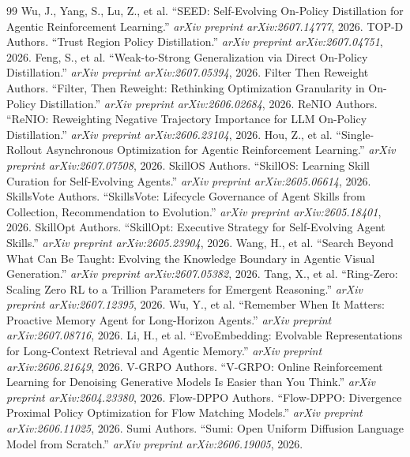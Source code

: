 \documentclass[11pt,a4paper]{article}
\begin{document}
\begin{thebibliography}{99}
 Wu, J., Yang, S., Lu, Z., et al. ``SEED: Self-Evolving On-Policy Distillation for Agentic Reinforcement Learning.'' \emph{arXiv preprint arXiv:2607.14777}, 2026.
 TOP-D Authors. ``Trust Region Policy Distillation.'' \emph{arXiv preprint arXiv:2607.04751}, 2026.
 Feng, S., et al. ``Weak-to-Strong Generalization via Direct On-Policy Distillation.'' \emph{arXiv preprint arXiv:2607.05394}, 2026.
 Filter Then Reweight Authors. ``Filter, Then Reweight: Rethinking Optimization Granularity in On-Policy Distillation.'' \emph{arXiv preprint arXiv:2606.02684}, 2026.
 ReNIO Authors. ``ReNIO: Reweighting Negative Trajectory Importance for LLM On-Policy Distillation.'' \emph{arXiv preprint arXiv:2606.23104}, 2026.
 Hou, Z., et al. ``Single-Rollout Asynchronous Optimization for Agentic Reinforcement Learning.'' \emph{arXiv preprint arXiv:2607.07508}, 2026.
 SkillOS Authors. ``SkillOS: Learning Skill Curation for Self-Evolving Agents.'' \emph{arXiv preprint arXiv:2605.06614}, 2026.
 SkillsVote Authors. ``SkillsVote: Lifecycle Governance of Agent Skills from Collection, Recommendation to Evolution.'' \emph{arXiv preprint arXiv:2605.18401}, 2026.
 SkillOpt Authors. ``SkillOpt: Executive Strategy for Self-Evolving Agent Skills.'' \emph{arXiv preprint arXiv:2605.23904}, 2026.
 Wang, H., et al. ``Search Beyond What Can Be Taught: Evolving the Knowledge Boundary in Agentic Visual Generation.'' \emph{arXiv preprint arXiv:2607.05382}, 2026.
 Tang, X., et al. ``Ring-Zero: Scaling Zero RL to a Trillion Parameters for Emergent Reasoning.'' \emph{arXiv preprint arXiv:2607.12395}, 2026.
 Wu, Y., et al. ``Remember When It Matters: Proactive Memory Agent for Long-Horizon Agents.'' \emph{arXiv preprint arXiv:2607.08716}, 2026.
 Li, H., et al. ``EvoEmbedding: Evolvable Representations for Long-Context Retrieval and Agentic Memory.'' \emph{arXiv preprint arXiv:2606.21649}, 2026.
 V-GRPO Authors. ``V-GRPO: Online Reinforcement Learning for Denoising Generative Models Is Easier than You Think.'' \emph{arXiv preprint arXiv:2604.23380}, 2026.
 Flow-DPPO Authors. ``Flow-DPPO: Divergence Proximal Policy Optimization for Flow Matching Models.'' \emph{arXiv preprint arXiv:2606.11025}, 2026.
 Sumi Authors. ``Sumi: Open Uniform Diffusion Language Model from Scratch.'' \emph{arXiv preprint arXiv:2606.19005}, 2026.
\end{thebibliography}
\end{document}
